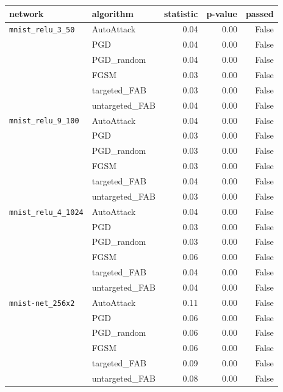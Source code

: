 \begin{tabular}{llrrr}
\toprule
network & algorithm & statistic & p-value & passed \\
\midrule
\texttt{mnist\_relu\_3\_50} & AutoAttack & 0.04 & 0.00 & False \\
 & PGD & 0.04 & 0.00 & False \\
 & PGD\_random & 0.04 & 0.00 & False \\
 & FGSM & 0.03 & 0.00 & False \\
 & targeted\_FAB & 0.03 & 0.00 & False \\
 & untargeted\_FAB & 0.04 & 0.00 & False \\
\texttt{mnist\_relu\_9\_100} & AutoAttack & 0.04 & 0.00 & False \\
 & PGD & 0.03 & 0.00 & False \\
 & PGD\_random & 0.03 & 0.00 & False \\
 & FGSM & 0.03 & 0.00 & False \\
 & targeted\_FAB & 0.04 & 0.00 & False \\
 & untargeted\_FAB & 0.03 & 0.00 & False \\
\texttt{mnist\_relu\_4\_1024} & AutoAttack & 0.04 & 0.00 & False \\
 & PGD & 0.03 & 0.00 & False \\
 & PGD\_random & 0.03 & 0.00 & False \\
 & FGSM & 0.06 & 0.00 & False \\
 & targeted\_FAB & 0.04 & 0.00 & False \\
 & untargeted\_FAB & 0.04 & 0.00 & False \\
\texttt{mnist-net\_256x2} & AutoAttack & 0.11 & 0.00 & False \\
 & PGD & 0.06 & 0.00 & False \\
 & PGD\_random & 0.06 & 0.00 & False \\
 & FGSM & 0.06 & 0.00 & False \\
 & targeted\_FAB & 0.09 & 0.00 & False \\
 & untargeted\_FAB & 0.08 & 0.00 & False \\
\bottomrule
\end{tabular}
